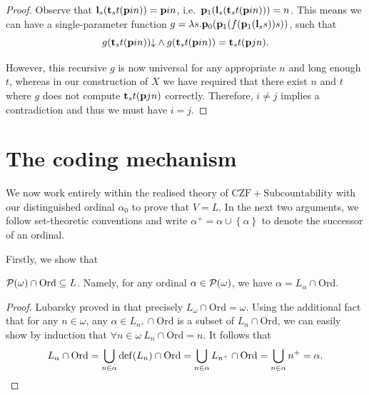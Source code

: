 \documentclass[preprint]{elsarticle}
\theoremstyle{plain}
\newcommand{\Ord}{\mathrm{Ord}}
\DeclareMathOperator{\dd}{def}
\begin{document}
\begin{proof}
  Observe that $\mathbf{l}_s \mleft(\mathbf{t}_s t \mleft(\mathbf{p}in\mright)\mright) = \mathbf{p}in$, i.e.\ $\mathbf{p}_1 \mleft(\mathbf{l}_s \mleft(\mathbf{t}_s t \mleft(\mathbf{p}in\mright)\mright)\mright) = n$. This means we can have a single-parameter function $g = \lambda s. \mathbf{p}_0\mleft(\mathbf{p}_1\mleft(f \mleft(\mathbf{p}_1 \mleft(\mathbf{l}_s s\mright)\mright) s\mright)\mright)$, such that
  \[g\mleft(\mathbf{t}_s t \mleft(\mathbf{p}in\mright)\mright) {\downarrow} \land g\mleft(\mathbf{t}_s t \mleft(\mathbf{p}in\mright)\mright) = \mathbf{t}_s t \mleft(\mathbf{p}jn\mright).\]

  However, this recursive $g$ is now universal for any appropriate $n$ and long enough $t$, whereas in our construction of $X$ we have required that there exist $n$ and $t$ where $g$ does not compute $\mathbf{t}_s t \mleft(\mathbf{p}jn\mright)$ correctly. Therefore, $i \neq j$ implies a contradiction and thus we must have $i = j$.
\end{proof}

\section{The coding mechanism}

We now work entirely within the realised theory of $\mathrm{CZF} + \text{Subcountability}$ with our distinguished ordinal $\alpha_0$ to prove that $V = L$. In the next two arguments, we follow set-theoretic conventions and write $\alpha^+ = \alpha \cup \left\{\alpha\right\}$ to denote the successor of an ordinal.

Firstly, we show that
\begin{lemma}
  \label{lem:subset-omega-l}
  $\mathcal{P}\mleft(\omega\mright) \cap \Ord \subseteq L$. Namely, for any ordinal $\alpha \in \mathcal{P}\mleft(\omega\mright)$, we have $\alpha = L_\alpha \cap \Ord$.
\end{lemma}

\begin{proof}
  Lubarsky proved in \cite{lubarsky93-intuitionistic-l} that precisely $L_\omega \cap \Ord = \omega$. Using the additional fact that for any $n \in \omega$, any $\alpha \in L_{n^+} \cap \Ord$ is a subset of $L_n \cap \Ord$, we can easily show by induction that $\forall n \in \omega \ L_n \cap \Ord = n$. It follows that
  \[L_\alpha \cap \Ord = \bigcup_{n \in \alpha} \dd\mleft(L_n\mright)  \cap \Ord = \bigcup_{n \in \alpha} L_{n^+} \cap \Ord = \bigcup_{n \in \alpha} n^+ = \alpha. \qedhere\]
\end{proof}
\end{document}
